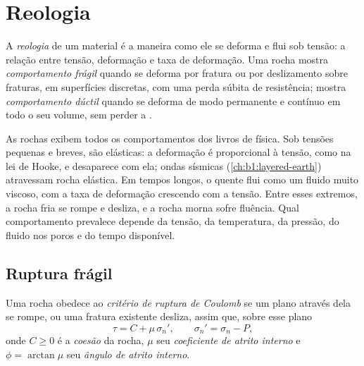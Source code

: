 \section{Reologia}\label{sec:b1:stress-strain-rheology:rheology}

\begin{definition}\label{def:b1:stress-strain-rheology:rheology}
A \emph{reologia} de um material é a maneira como ele se deforma e flui sob tensão: a relação entre tensão, deformação e taxa de deformação. Uma rocha mostra \emph{comportamento frágil} quando se deforma por fratura ou por deslizamento sobre fraturas, em superfícies discretas, com uma perda súbita de resistência; mostra \emph{comportamento dúctil} quando se deforma de modo permanente e contínuo em todo o seu volume, sem perder a .
\end{definition}

As rochas exibem todos os comportamentos dos livros de física. Sob tensões pequenas e breves, são elásticas: a deformação é proporcional à tensão, como na lei de Hooke, e desaparece com ela; ondas sísmicas (\cref{ch:b1:layered-earth}) atravessam rocha elástica. Em tempos longos, o  quente flui como um fluido muito viscoso, com a taxa de deformação crescendo com a tensão. Entre esses extremos, a rocha fria se rompe e desliza, e a rocha morna sofre fluência. Qual comportamento prevalece depende da tensão, da temperatura, da pressão, do fluido nos poros e do tempo disponível.

\subsection*{Ruptura frágil}

\begin{definition}\label{def:b1:stress-strain-rheology:coulomb}
Uma rocha obedece ao \emph{critério de ruptura de Coulomb} se um plano através dela se rompe, ou uma fratura existente desliza, assim que, sobre esse plano
\[
  \tau = C + \mu\,\sigma_n' , \qquad \sigma_n' = \sigma_n - P ,
\]
onde $C \ge 0$ é a \emph{coesão} da rocha, $\mu$ seu \emph{coeficiente de atrito interno} e $\phi = \arctan\mu$ seu \emph{ângulo de atrito interno}.
\end{definition}

